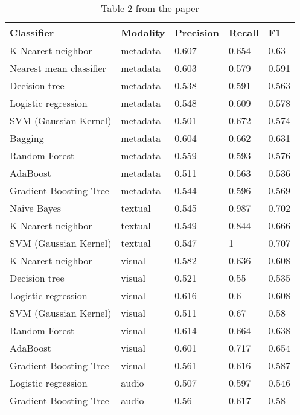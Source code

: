 \documentclass[sigconf]{acmart}
\begin{document}
\begin{table}[hbt!]
\caption*{Table 2 from the paper}
\begin{tabular}{lllll}
\hline
Classifier             & Modality & Precision & Recall & F1    \\ \hline
K-Nearest neighbor     & metadata & 0.607     & 0.654  & 0.63  \\
Nearest mean classifier & metadata & 0.603     & 0.579  & 0.591 \\
Decision tree          & metadata & 0.538     & 0.591  & 0.563 \\
Logistic regression    & metadata & 0.548     & 0.609  & 0.578 \\
SVM (Gaussian Kernel)  & metadata & 0.501     & 0.672  & 0.574 \\
Bagging                & metadata & 0.604     & 0.662  & 0.631 \\
Random Forest          & metadata & 0.559     & 0.593  & 0.576 \\
AdaBoost               & metadata & 0.511     & 0.563  & 0.536 \\
Gradient Boosting Tree & metadata & 0.544     & 0.596  & 0.569 \\
Naive Bayes            & textual  & 0.545     & 0.987  & 0.702 \\
K-Nearest neighbor     & textual  & 0.549     & 0.844  & 0.666 \\
SVM (Gaussian Kernel)  & textual  & 0.547     & 1      & 0.707 \\
K-Nearest neighbor     & visual   & 0.582     & 0.636  & 0.608 \\
Decision tree          & visual   & 0.521     & 0.55   & 0.535 \\
Logistic regression    & visual   & 0.616     & 0.6    & 0.608 \\
SVM (Gaussian Kernel)  & visual   & 0.511     & 0.67   & 0.58  \\
Random Forest          & visual   & 0.614     & 0.664  & 0.638 \\
AdaBoost               & visual   & 0.601     & 0.717  & 0.654 \\
Gradient Boosting Tree & visual   & 0.561     & 0.616  & 0.587 \\
Logistic regression    & audio    & 0.507     & 0.597  & 0.546 \\
Gradient Boosting Tree & audio    & 0.56      & 0.617  & 0.58  \\ \hline
\end{tabular}
\end{table}
\end{document}
